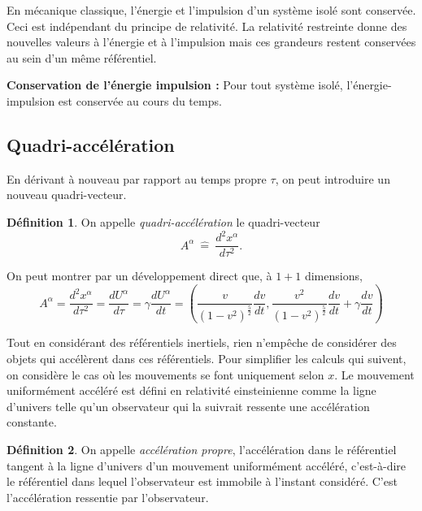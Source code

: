\documentclass[a4paper,11pt]{report}
\theoremstyle{definition}
\theoremstyle{plain}
\theoremstyle{definition}
\newtheorem{defn}{Définition}[chapter]
\theoremstyle{remark}
\begin{document}
            En mécanique classique, l'énergie et l'impulsion d'un système isolé sont conservée. Ceci est indépendant du principe de relativité. La relativité restreinte donne des nouvelles valeurs à l'énergie et à l'impulsion mais ces grandeurs restent conservées au sein d'un même référentiel.\\
            
            \begin{leftbar}
            \textbf{Conservation de l'énergie impulsion :} \quad Pour tout système isolé, l'énergie-impulsion est conservée au cours du temps.
            \end{leftbar}
            
        \subsection{Quadri-accélération}
        
            En dérivant à nouveau par rapport au temps propre $\tau$, on peut introduire un nouveau quadri-vecteur.
            \begin{defn}
                On appelle \textit{quadri-accélération} le quadri-vecteur
                \begin{equation}
                    A^\alpha ~\hat{=}~ \frac{d^2x^\alpha}{d\tau^2}.
                \end{equation}
            \end{defn}
            On peut montrer par un développement direct que, à $1+1$ dimensions,
            \begin{equation}
                A^\alpha = \frac{d^2x^\alpha}{d\tau^2} = \frac{dU^\alpha}{d\tau} = \gamma\frac{dU^\alpha}{dt} = \left( \frac{v}{(1-v^2)^{\frac{5}{2}}}\frac{dv}{dt}, \frac{v^2}{(1-v^2)^{\frac{5}{2}}}\frac{dv}{dt} +\gamma \frac{dv}{dt}\right)
            \end{equation}
        
            Tout en considérant des référentiels inertiels, rien n'empêche de considérer des objets qui accélèrent dans ces référentiels. Pour simplifier les calculs qui suivent, on considère le cas où les mouvements se font uniquement selon $x$. Le mouvement uniformément accéléré est défini en relativité einsteinienne comme la ligne d'univers telle qu'un observateur qui la suivrait ressente une accélération constante.
            
            \begin{defn}
                On appelle \textit{accélération propre}, l'accélération dans le référentiel tangent à la ligne d'univers d'un mouvement uniformément accéléré, c'est-à-dire le référentiel dans lequel l'observateur est immobile à l'instant considéré. C'est l'accélération ressentie par l'observateur.
            \end{defn}
            
\end{document}
